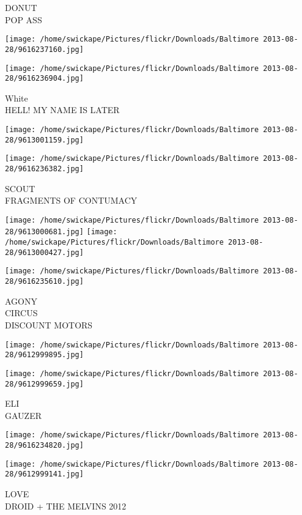 \documentclass[10pt,letterpaper]{article}
\begin{document}
DONUT\\
POP ASS
\pagebreak

\texttt{[image: /home/swickape/Pictures/flickr/Downloads/Baltimore 2013-08-28/9616237160.jpg]}

\vspace{0.25in}
\texttt{[image: /home/swickape/Pictures/flickr/Downloads/Baltimore 2013-08-28/9616236904.jpg]}

White\\
HELL! MY NAME IS LATER
\pagebreak

\texttt{[image: /home/swickape/Pictures/flickr/Downloads/Baltimore 2013-08-28/9613001159.jpg]}

\vspace{0.25in}
\texttt{[image: /home/swickape/Pictures/flickr/Downloads/Baltimore 2013-08-28/9616236382.jpg]}

SCOUT\\
FRAGMENTS OF CONTUMACY
\pagebreak

\texttt{[image: /home/swickape/Pictures/flickr/Downloads/Baltimore 2013-08-28/9613000681.jpg]}
\texttt{[image: /home/swickape/Pictures/flickr/Downloads/Baltimore 2013-08-28/9613000427.jpg]}

\vspace{0.25in}
\texttt{[image: /home/swickape/Pictures/flickr/Downloads/Baltimore 2013-08-28/9616235610.jpg]}

AGONY\\
CIRCUS\\
DISCOUNT MOTORS
\pagebreak

\texttt{[image: /home/swickape/Pictures/flickr/Downloads/Baltimore 2013-08-28/9612999895.jpg]}

\vspace{0.25in}
\texttt{[image: /home/swickape/Pictures/flickr/Downloads/Baltimore 2013-08-28/9612999659.jpg]}

ELI\\
GAUZER
\pagebreak

\texttt{[image: /home/swickape/Pictures/flickr/Downloads/Baltimore 2013-08-28/9616234820.jpg]}

\vspace{0.25in}
\texttt{[image: /home/swickape/Pictures/flickr/Downloads/Baltimore 2013-08-28/9612999141.jpg]}

LOVE\\
DROID + THE MELVINS 2012
\pagebreak
\end{document}
